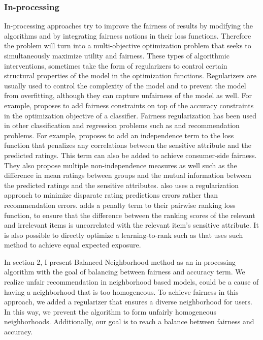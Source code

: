 \subsubsection{In-processing}
In-processing approaches try to improve the fairness of results by modifying the algorithms and by integrating fairness notions in their loss functions. Therefore the problem will turn into a multi-objective optimization problem that seeks to simultaneously maximize utility and fairness.
These types of algorithmic interventions, sometimes take the form of regularizers to control certain structural properties of the model in the optimization functions. 
Regularizers are usually used to control the complexity of the model and to prevent the model from overfitting, although they can capture unfairness of the model as well. For example, \cite{zafar2017fairness} proposes to add fairness constraints on top of the accuracy constraints in the optimization objective of a classifier. Fairness regularization has been used in other classification and regression problems such as \cite{kamishima2012fairness,berk2017convex} and recommendation problems. For example, \cite{kamishima2018recommendation, kamishima-} proposes to add an independence term to the loss function that penalizes any correlations between the sensitive attribute and the predicted ratings. This term can also be added to achieve consumer-side fairness\cite{kamishima2017considerations}. They also propose multiple non-independence measures as well such as the difference in mean ratings between groups and the mutual information between the predicted ratings and the sensitive attributes. \cite{yao_huang_fatml-2017} also uses a regularization approach to minimize disparate rating predictions errors rather than recommendation errors. \cite{beutel2017data} adds a penalty term to their pairwise ranking loss function, to ensure that the difference between the ranking scores of the relevant and irrelevant items is uncorrelated with the relevant item's sensitive attribute. It is also possible to directly optimize a learning-to-rank such as \cite{diaz2020} that uses such method to achieve equal expected exposure.

In section 2, I present Balanced Neighborhood method as an in-processing algorithm with the goal of balancing between fairness and accuracy term. We realize unfair recommendation in neighborhood based models, could be a cause of having a neighborhood that is too homogeneous. To achieve fairness in this approach, we added a regularizer that ensures a diverse neighborhood for users. In this way, we prevent the algorithm to form unfairly homogeneous neighborhoods. Additionally, our goal is to reach a balance between fairness and accuracy.

